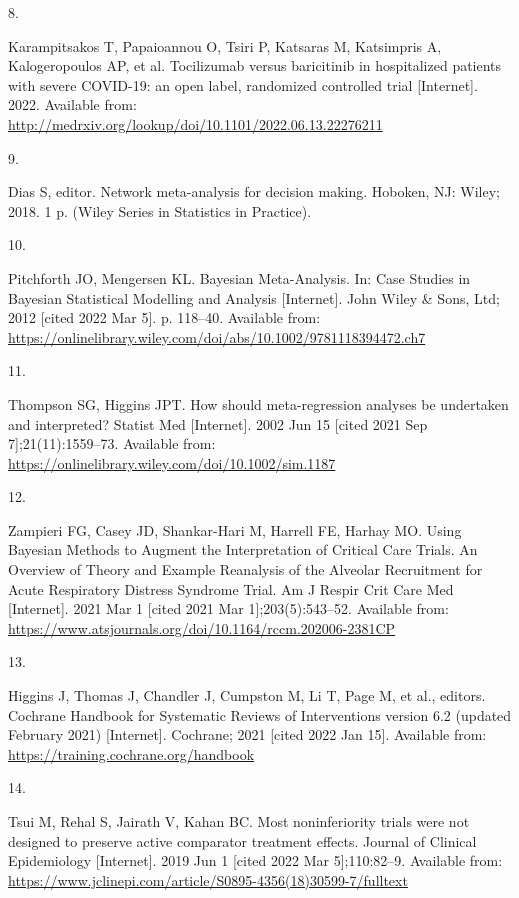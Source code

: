 \documentclass[
  12pt,
]{article}
\newlength{\cslhangindent}
\newlength{\csllabelwidth}
\newlength{\cslentryspacingunit} %
\newenvironment{CSLReferences}[2] %
 {%
  \setlength{\parindent}{0pt}
  \ifodd #1
  \let\oldpar\par
  \def\par{\hangindent=\cslhangindent\oldpar}
  \fi
  \setlength{\parskip}{#2\cslentryspacingunit}
 }%
 {}
\newcommand{\CSLLeftMargin}[1]{\parbox[t]{\csllabelwidth}{#1}}
\newcommand{\CSLRightInline}[1]{\parbox[t]{\linewidth - \csllabelwidth}{#1}\break}
\begin{document}
\begin{CSLReferences}{0}{0}
\leavevmode{}%
\CSLLeftMargin{8. }
\CSLRightInline{Karampitsakos T, Papaioannou O, Tsiri P, Katsaras M,
Katsimpris A, Kalogeropoulos AP, et al. Tocilizumab versus baricitinib
in hospitalized patients with severe COVID-19: an open label, randomized
controlled trial {[}Internet{]}. 2022. Available from:
\url{http://medrxiv.org/lookup/doi/10.1101/2022.06.13.22276211}}

\leavevmode{}%
\CSLLeftMargin{9. }
\CSLRightInline{Dias S, editor. Network meta-analysis for decision
making. Hoboken, NJ: Wiley; 2018. 1 p. (Wiley Series in Statistics in
Practice). }

\leavevmode{}%
\CSLLeftMargin{10. }
\CSLRightInline{Pitchforth JO, Mengersen KL. Bayesian Meta-Analysis. In:
Case Studies in Bayesian Statistical Modelling and Analysis
{[}Internet{]}. John Wiley \& Sons, Ltd; 2012 {[}cited 2022 Mar 5{]}. p.
118--40. Available from:
\url{https://onlinelibrary.wiley.com/doi/abs/10.1002/9781118394472.ch7}}

\leavevmode{}%
\CSLLeftMargin{11. }
\CSLRightInline{Thompson SG, Higgins JPT. How should meta-regression
analyses be undertaken and interpreted? Statist Med {[}Internet{]}. 2002
Jun 15 {[}cited 2021 Sep 7{]};21(11):1559--73. Available from:
\url{https://onlinelibrary.wiley.com/doi/10.1002/sim.1187}}

\leavevmode{}%
\CSLLeftMargin{12. }
\CSLRightInline{Zampieri FG, Casey JD, Shankar-Hari M, Harrell FE,
Harhay MO. Using Bayesian Methods to Augment the Interpretation of
Critical Care Trials. An Overview of Theory and Example Reanalysis of
the Alveolar Recruitment for Acute Respiratory Distress Syndrome Trial.
Am J Respir Crit Care Med {[}Internet{]}. 2021 Mar 1 {[}cited 2021 Mar
1{]};203(5):543--52. Available from:
\url{https://www.atsjournals.org/doi/10.1164/rccm.202006-2381CP}}

\leavevmode{}%
\CSLLeftMargin{13. }
\CSLRightInline{Higgins J, Thomas J, Chandler J, Cumpston M, Li T, Page
M, et al., editors. Cochrane Handbook for Systematic Reviews of
Interventions version 6.2 (updated February 2021) {[}Internet{]}.
Cochrane; 2021 {[}cited 2022 Jan 15{]}. Available from:
\url{https://training.cochrane.org/handbook}}

\leavevmode{}%
\CSLLeftMargin{14. }
\CSLRightInline{Tsui M, Rehal S, Jairath V, Kahan BC. Most
noninferiority trials were not designed to preserve active comparator
treatment effects. Journal of Clinical Epidemiology {[}Internet{]}. 2019
Jun 1 {[}cited 2022 Mar 5{]};110:82--9. Available from:
\url{https://www.jclinepi.com/article/S0895-4356(18)30599-7/fulltext}}


\end{CSLReferences}
\end{document}
